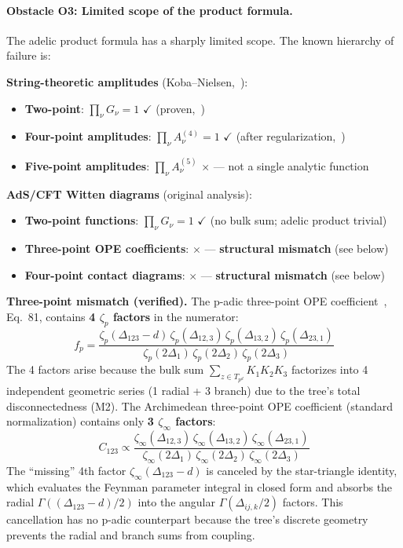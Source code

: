 \documentclass[11pt,a4paper]{article}
\begin{document}
\paragraph{Obstacle O3: Limited scope of the product formula.}
The adelic product formula has a sharply limited scope. The known hierarchy of failure is:

\textbf{String-theoretic amplitudes} (Koba--Nielsen,~\cite{J22}):
\begin{itemize}[leftmargin=2em]
    \item \textbf{Two-point}: $\prod_\nu G_\nu = 1$ $\checkmark$ (proven,~\cite{HSYZ20})
    \item \textbf{Four-point amplitudes}: $\prod_\nu A^{(4)}_\nu = 1$ $\checkmark$ (after regularization,~\cite{J22})
    \item \textbf{Five-point amplitudes}: $\prod_\nu A^{(5)}_\nu$ $\times$ --- not a single analytic function~\cite{J22}
\end{itemize}

\textbf{AdS/CFT Witten diagrams} (original analysis):
\begin{itemize}[leftmargin=2em]
    \item \textbf{Two-point functions}: $\prod_\nu G_\nu = 1$ $\checkmark$ (no bulk sum; adelic product trivial)
    \item \textbf{Three-point OPE coefficients}: $\times$ --- \textbf{structural mismatch} (see below)
    \item \textbf{Four-point contact diagrams}: $\times$ --- \textbf{structural mismatch} (see below)
\end{itemize}

\medskip\noindent
\textbf{Three-point mismatch (verified).}
The p-adic three-point OPE coefficient~\cite{HJ24}, Eq.~81, contains \textbf{4 $\zeta_p$ factors} in the numerator:
\begin{equation}
f_p = \frac{\zeta_p(\Delta_{123}{-}d)\,\zeta_p(\Delta_{12,3})\,\zeta_p(\Delta_{13,2})\,\zeta_p(\Delta_{23,1})}{\zeta_p(2\Delta_1)\,\zeta_p(2\Delta_2)\,\zeta_p(2\Delta_3)}
\end{equation}
The 4 factors arise because the bulk sum $\sum_{z \in T_{p^d}} K_1 K_2 K_3$ factorizes into 4 independent geometric series (1 radial + 3 branch) due to the tree's total disconnectedness (M2). The Archimedean three-point OPE coefficient (standard normalization) contains only \textbf{3 $\zeta_\infty$ factors}:
\begin{equation}
C_{123} \propto \frac{\zeta_\infty(\Delta_{12,3})\,\zeta_\infty(\Delta_{13,2})\,\zeta_\infty(\Delta_{23,1})}{\zeta_\infty(2\Delta_1)\,\zeta_\infty(2\Delta_2)\,\zeta_\infty(2\Delta_3)}
\end{equation}
The ``missing'' 4th factor $\zeta_\infty(\Delta_{123}{-}d)$ is canceled by the star-triangle identity, which evaluates the Feynman parameter integral in closed form and absorbs the radial $\Gamma((\Delta_{123}{-}d)/2)$ into the angular $\Gamma(\Delta_{ij,k}/2)$ factors. This cancellation has no p-adic counterpart because the tree's discrete geometry prevents the radial and branch sums from coupling.
\end{document}
